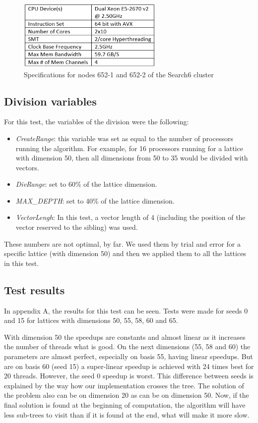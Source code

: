 \documentclass[conference]{IEEEtran}
\begin{document}
\begin{figure}[ht!]
\centering
\includegraphics[width=70mm]{TestesFinais/652Specs}
\caption{Specifications for nodes 652-1 and 652-2 of the Search6 cluster}
\end{figure}


\subsection{Division variables}
For this test, the variables of the division were the following:

\begin{itemize}
\item \emph{CreateRange}: this variable was set as equal to the number of processors running the algorithm. For example, for 16 processors running for a lattice with dimension 50, then all dimensions from 50 to 35 would be divided with vectors.
\item \emph{DivRange}: set to 60\% of the lattice dimension.
\item \emph{MAX\_DEPTH}: set to 40\% of the lattice dimension.
\item \emph{VectorLengh}: In this test, a vector length of 4 (including the position of the vector reserved to the sibling) was used.
\end{itemize}

These numbers are not optimal, by far. We used them by trial and error for a specific lattice (with dimension 50) and then we applied them to all the lattices in this test. 


\subsection{Test results}


In appendix A, the results for this test can be seen. Tests were made for seeds 0 and 15 for lattices with dimensions 50, 55, 58, 60 and 65. 

With dimension 50 the speedups are constants and almost linear as it increases the number of threads what is good. On the next dimensions (55, 58 and 60) the parameters are almost perfect, especially on basis 55, having linear speedups. But are on basis 60 (seed 15) a super-linear speedup is achieved with 24 times best for 20 threads. However, the seed 0 speedup is worst. This difference between seeds is explained by the way how our implementation crosses the tree. The solution of the problem also can be on dimension 20 as can be on dimension 50. Now, if the final solution is found at the beginning of computation, the algorithm will have less sub-trees to visit than if it is found at the end, what will make it more slow.
\end{document}
